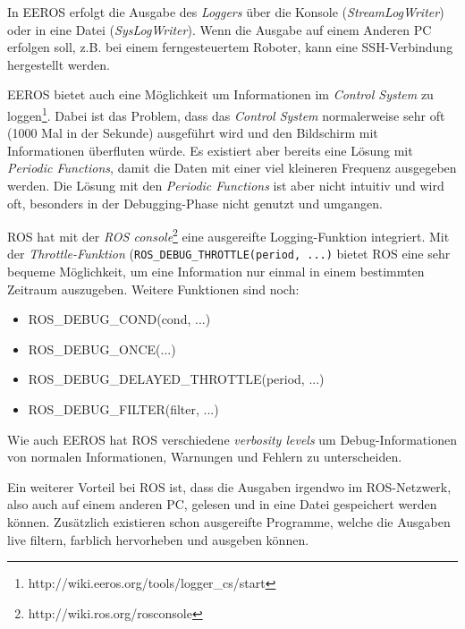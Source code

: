 In EEROS erfolgt die Ausgabe des \textit{Loggers} über die Konsole (\textit{StreamLogWriter}) oder in eine Datei (\textit{SysLogWriter}).
Wenn die Ausgabe auf einem Anderen PC erfolgen soll, z.B. bei einem ferngesteuertem Roboter, kann eine SSH-Verbindung hergestellt werden.

EEROS bietet auch eine Möglichkeit um Informationen im \textit{Control System} zu loggen\footnote{http://wiki.eeros.org/tools/logger\_cs/start}.
Dabei ist das Problem, dass das \textit{Control System} normalerweise sehr oft (1000 Mal in der Sekunde) ausgeführt wird und den Bildschirm mit Informationen überfluten würde.
Es existiert aber bereits eine Lösung mit \textit{Periodic Functions}, damit die Daten mit einer viel kleineren Frequenz ausgegeben werden.
Die Lösung mit den \textit{Periodic Functions} ist aber nicht intuitiv und wird oft, besonders in der Debugging-Phase nicht genutzt und umgangen.

ROS hat mit der \textit{ROS console}\footnote{http://wiki.ros.org/rosconsole} eine ausgereifte Logging-Funktion integriert.
Mit der \textit{Throttle-Funktion} (\texttt{ROS\_DEBUG\_THROTTLE(period, ...)} bietet ROS eine sehr bequeme Möglichkeit, um eine Information nur einmal in einem bestimmten Zeitraum auszugeben.
Weitere Funktionen sind noch:

\begin{itemize}
\item ROS\_DEBUG\_COND(cond, ...)
\item ROS\_DEBUG\_ONCE(...)
\item ROS\_DEBUG\_DELAYED\_THROTTLE(period, ...)
\item ROS\_DEBUG\_FILTER(filter, ...)
\end{itemize}

Wie auch EEROS hat ROS verschiedene \textit{verbosity levels} um Debug-Informationen von normalen Informationen, Warnungen und Fehlern zu unterscheiden.

Ein weiterer Vorteil bei ROS ist, dass die Ausgaben irgendwo im ROS-Netzwerk, also auch auf einem anderen PC, gelesen und in eine Datei gespeichert werden können.
Zusätzlich existieren schon ausgereifte Programme, welche die Ausgaben live filtern, farblich hervorheben und ausgeben können. 

